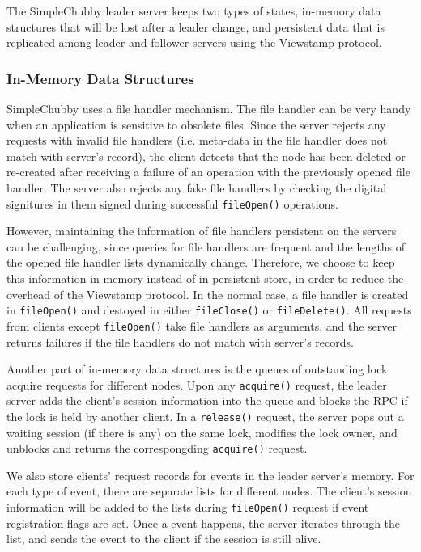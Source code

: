 The SimpleChubby leader server keeps two types of states,
in-memory data structures that will be lost after a leader change,
and persistent data that is replicated
among leader and follower servers using the Viewstamp protocol.


\subsubsection{In-Memory Data Structures}

SimpleChubby uses a file handler mechanism. The file handler can be very
handy when an application is sensitive to obsolete files. Since the server
rejects any requests with invalid file handlers (i.e. meta-data in the file
handler does not match with server's record), the client detects that the node has
been deleted or re-created after receiving a failure of an operation with
the previously opened file handler. The server also rejects any fake file
handlers by checking the digital signitures in them signed during successful
\texttt{fileOpen()} operations.

However, maintaining the information of file handlers persistent on the servers can
be challenging, since queries for file handlers are frequent and the lengths
of the opened file handler lists dynamically change. Therefore, we choose
to keep this information in memory instead of in persistent store, in order
to reduce the overhead of the Viewstamp protocol. In the normal case, a file
handler is created in \texttt{fileOpen()} and destoyed in either
\texttt{fileClose()} or \texttt{fileDelete()}.
All requests from clients except \texttt{fileOpen()} take file handlers as
arguments,
and the server returns failures if the file handlers do not match with
server's records.

Another part of in-memory data structures is the queues of outstanding lock
acquire requests for different nodes. Upon any \texttt{acquire()} request, the
leader server adds the client's session information into the queue and
blocks the RPC if the lock is held by another client.
In a \texttt{release()} request, the server pops out a waiting session
(if there is any) on the same lock, modifies the lock owner, and unblocks and
returns the correspongding \texttt{acquire()} request.

We also store clients' request records for events in the leader server's memory.
For each type of event, there are separate lists for different nodes.
The client's session information will be added to the lists during
\texttt{fileOpen()}
request if event registration flags are set. Once a event happens,
the server iterates through the list, and sends the event to the client if the
session is still alive.

